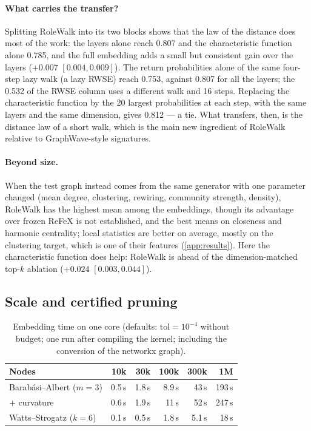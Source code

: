 \documentclass[10pt]{article}
\theoremstyle{definition}
\newcommand{\tol}{\mathrm{tol}}
\begin{document}
\paragraph{What carries the transfer?}
Splitting RoleWalk into its two blocks shows that the law of the distance does most of the work: the layers alone reach 0.807 and the characteristic function alone 0.785, and the full embedding adds a small but consistent gain over the layers ($+0.007$ $[0.004,0.009]$). The return probabilities alone of the same four-step lazy walk (a lazy RWSE) reach 0.753, against 0.807 for all the layers; the 0.532 of the RWSE column uses a different walk and 16 steps.
Replacing the characteristic function by the 20 largest probabilities at each step, with the same layers and the same dimension, gives 0.812 --- a tie.
What transfers, then, is the distance law of a short walk, which is the main new ingredient of RoleWalk relative to GraphWave-style signatures.

\paragraph{Beyond size.}
When the test graph instead comes from the same generator with one parameter changed (mean degree, clustering, rewiring, community strength, density), RoleWalk has the highest mean among the embeddings, though its advantage over frozen ReFeX is not established, and the best means on closeness and harmonic centrality; local statistics are better on average, mostly on the clustering target, which is one of their features (\cref{app:results}). Here the characteristic function does help: RoleWalk is ahead of the dimension-matched top-$k$ ablation ($+0.024$ $[0.003, 0.044]$).

\subsection{Scale and certified pruning}

\begin{table}[t]
\centering
\caption{Embedding time on one core (defaults: $\tol=10^{-4}$ without budget; one run after compiling the kernel; including the conversion of the networkx graph).}
\label{tab:scale}
\small
\begin{tabular}{lrrrrr}
\toprule
Nodes & 10k & 30k & 100k & 300k & 1M \\
\midrule
Barabási--Albert ($m=3$) & 0.5\,s & 1.8\,s & 8.9\,s & 43\,s & 193\,s \\
\quad + curvature & 0.6\,s & 1.9\,s & 11\,s & 52\,s & 247\,s \\
Watts--Strogatz ($k=6$) & 0.1\,s & 0.5\,s & 1.8\,s & 5.1\,s & 18\,s \\
\bottomrule
\end{tabular}
\end{table}
\end{document}
